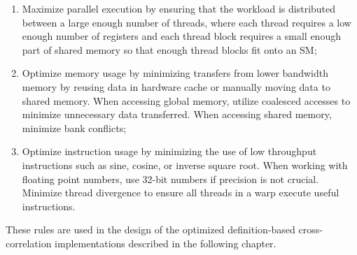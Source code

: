 \begin{enumerate}
	\item Maximize parallel execution by ensuring that the workload is distributed between a large enough number of threads, where each thread requires a low enough number of registers and each thread block requires a small enough part of shared memory so that enough thread blocks fit onto an SM;
	\item Optimize memory usage by minimizing transfers from lower bandwidth memory by reusing data in hardware cache or manually moving data to shared memory. When accessing global memory, utilize coalesced accesses to minimize unnecessary data transferred. When accessing shared memory, minimize bank conflicts;
	\item Optimize instruction usage by minimizing the use of low throughput instructions such as sine, cosine, or inverse square root. When working with floating point numbers, use 32-bit numbers if precision is not crucial. Minimize thread divergence to ensure all threads in a warp execute useful instructions.
\end{enumerate}

These rules are used in the design of the optimized definition-based cross-correlation implementations described in the following chapter.








